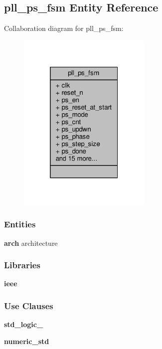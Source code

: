 \subsection{pll\+\_\+ps\+\_\+fsm Entity Reference}
\label{classpll__ps__fsm}


Collaboration diagram for pll\+\_\+ps\+\_\+fsm\+:\nopagebreak
\begin{figure}[H]
\begin{center}
\leavevmode
\includegraphics[width=181pt]{dd/d97/classpll__ps__fsm__coll__graph}
\end{center}
\end{figure}
\subsubsection*{Entities}
\begin{DoxyCompactItemize}
\item 
{\bf arch} architecture
\end{DoxyCompactItemize}
\subsubsection*{Libraries}
 \begin{DoxyCompactItemize}
\item 
{\bf ieee} 
\end{DoxyCompactItemize}
\subsubsection*{Use Clauses}
 \begin{DoxyCompactItemize}
\item 
{\bf std\+\_\+logic\+\_}   
\item 
{\bf numeric\+\_\+std}   
\end{DoxyCompactItemize}
